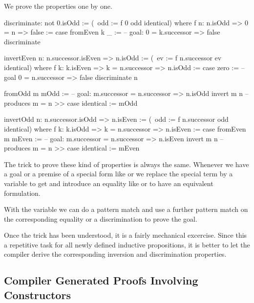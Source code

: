 \noindent We prove the properties one by one.

\begin{alba}
    discriminate: not 0.isOdd :=
        (\ odd := f 0 odd identical)
        where
        f n: n.isOdd => 0 = n => false
        :=
            case
                fromEven k _ :=
                    -- goal: 0 = k.successor => false
                    discriminate

    invertEven n: n.successor.isEven => n.isOdd
    :=
        (\ ev := f n.successor ev identical)
        where
        f k: k.isEven => k = n.successor => n.isOdd
        :=
            case
                zero :=
                    -- goal 0 = n.successor => false
                    discriminate n

                fromOdd m mOdd :=
                    -- goal: m.successor = n.successor => n.isOdd
                    invert m n -- produces m = n
                    >>
                    case
                        identical := mOdd

    invertOdd n: n.successor.isOdd => n.isEven
    :=
        (\ odd := f n.successor odd identical)
        where
        f k: k.isOdd => k = n.successor => n.isEven
        :=
            case
                fromEven m mEven :=
                    -- goal: m.successor = n.successor => n.isEven
                    invert m n -- produces m = n
                    >>
                    case
                        identical := mEven
\end{alba}

The trick to prove these kind of properties is always the same. Whenever we have
a goal or a premise of a special form like  or
 we replace the special term by a variable to get
 and introduce an equality like  or  to have an equivalent formulation.

With the variable we can do a pattern match and use a further pattern match on
the corresponding equality or a discrimination to prove the goal.

Once the trick has been understood, it is a fairly mechanical excercise. Since
this a repetitive task for all newly defined inductive propositions, it is
better to let the compiler derive the corresponding inversion and discrimination
properties.



\subsection{Compiler Generated Proofs Involving Constructors}



